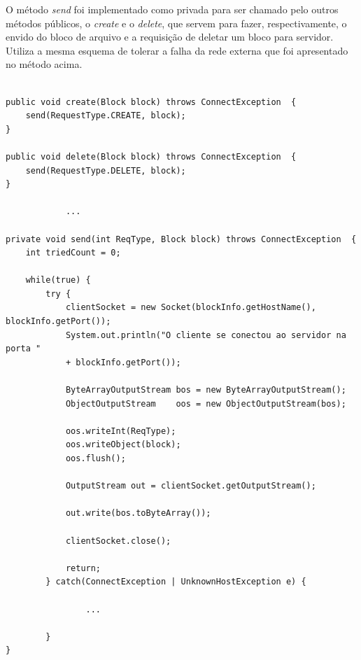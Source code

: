 O método \textit{send} foi implementado como privada para ser chamado pelo outros métodos públicos, o \textit{create} e o \textit{delete}, que servem para fazer, respectivamente, o envido do bloco de arquivo e a requisição de deletar um bloco para servidor.
Utiliza a mesma esquema de tolerar a falha da rede externa que foi apresentado no método acima.

\begin{lstlisting}[basicstyle=\ttfamily\footnotesize, frame=single]	

public void create(Block block) throws ConnectException  {
	send(RequestType.CREATE, block);
}

public void delete(Block block) throws ConnectException  {
	send(RequestType.DELETE, block);
}

			...

private void send(int ReqType, Block block) throws ConnectException  {
	int triedCount = 0;
	
	while(true) {
		try {
			clientSocket = new Socket(blockInfo.getHostName(), blockInfo.getPort());
			System.out.println("O cliente se conectou ao servidor na porta " 
			+ blockInfo.getPort());
			
			ByteArrayOutputStream bos = new ByteArrayOutputStream();
			ObjectOutputStream    oos = new ObjectOutputStream(bos);
			
			oos.writeInt(ReqType);
			oos.writeObject(block);
			oos.flush();
			
			OutputStream out = clientSocket.getOutputStream();
			
			out.write(bos.toByteArray());
			
			clientSocket.close();
			
			return;
		} catch(ConnectException | UnknownHostException e) {
		
				...
				
		}
}
\end{lstlisting}


